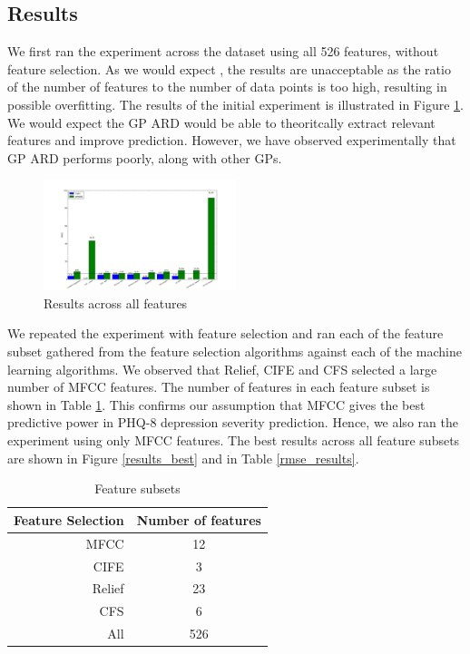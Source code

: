\documentclass{article}
\begin{document}
	\subsection{Results}
	We first ran the experiment across the dataset using all 526 features, without feature selection. 
	As we would expect \cite{Cawley2014}, the results are unacceptable as the ratio of the number of features to the number of data points is too high,
	resulting in possible overfitting. 
	The results of the initial experiment is illustrated in Figure \ref{results_all}. 
	We would expect the GP ARD would be able to theoritcally extract relevant features and improve prediction.
	However, we have observed experimentally that GP ARD performs poorly, along with other GPs. \\

	\begin{figure}[h]
 		\begin{center}
		\includegraphics[width=0.5\textwidth]{results_all} 
  		\end{center}
  		\caption{Results across all features}
  		\label{results_all}
 	\end{figure}
	
	We repeated the experiment with feature selection and ran each of the feature subset gathered from the feature selection algorithms against each of the machine 
	learning algorithms. 
	We observed that Relief, CIFE and CFS selected a large number of MFCC features. 
	The number of features in each feature subset is shown in Table \ref{feat_subset}. 
	This confirms our assumption that MFCC gives the best predictive power in PHQ-8 depression severity prediction. 
	Hence, we also ran the experiment using only MFCC features. 
	The best results across all feature subsets are shown in Figure \ref{results_best} and in Table \ref{rmse_results}. \\

 	\begin{table}[h]
 		\begin{center}
  			\begin{tabular}{ | r | c | }
    			\hline
			 \bfseries Feature Selection 	&\bfseries Number of features \\ \hline
			 MFCC           			& 12 \\ \hline
			 CIFE        				& 3 \\ \hline
			 Relief 				& 23 \\ \hline
			 CFS 					& 6 \\ \hline
			 All 					& 526 \\ \hline
			 \end{tabular}
		\end{center}
 	\caption{Feature subsets}
 	\label{feat_subset}
 	\end{table}
\end{document}
